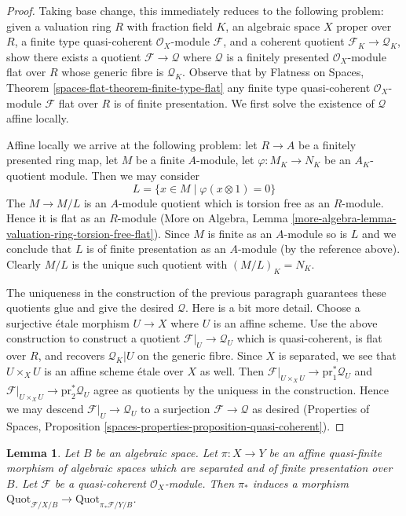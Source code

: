 \documentclass{stacks-project}
\theoremstyle{plain}
\newtheorem{lemma}[subsection]{Lemma}
\theoremstyle{definition}
\theoremstyle{remark}
\numberwithin{equation}{subsection}
\def\Quotfunctor{\mathrm{Quot}}
\begin{document}
\begin{proof}
Taking base change, this immediately reduces to the following
problem: given a valuation ring $R$ with fraction field $K$,
an algebraic space $X$ proper over $R$, a finite type quasi-coherent
$\mathcal{O}_X$-module $\mathcal{F}$, and a coherent
quotient $\mathcal{F}_K \to \mathcal{Q}_K$, show there exists
a quotient $\mathcal{F} \to \mathcal{Q}$ where $\mathcal{Q}$ is a
finitely presented $\mathcal{O}_X$-module
flat over $R$ whose generic fibre is $\mathcal{Q}_K$.
Observe that by Flatness on Spaces, Theorem
\ref{spaces-flat-theorem-finite-type-flat}
any finite type quasi-coherent $\mathcal{O}_X$-module
$\mathcal{F}$ flat over $R$ is of finite presentation.
We first solve the existence of $\mathcal{Q}$ affine locally.

\medskip\noindent
Affine locally we arrive at the following problem:
let $R \to A$ be a finitely presented ring map,
let $M$ be a finite $A$-module, let $\varphi : M_K \to N_K$ be
an $A_K$-quotient module. Then we may consider
$$
L = \{x \in M \mid \varphi(x \otimes 1) = 0 \}
$$
The $M \to M/L$ is an $A$-module quotient which is
torsion free as an $R$-module. Hence it is flat as an
$R$-module (More on Algebra, Lemma
\ref{more-algebra-lemma-valuation-ring-torsion-free-flat}).
Since $M$ is finite as an $A$-module so is $L$ and we
conclude that $L$ is of finite presentation as an $A$-module
(by the reference above). Clearly $M/L$ is the unique such
quotient with $(M/L)_K = N_K$.

\medskip\noindent
The uniqueness in the construction of the previous paragraph
guarantees these quotients glue and give the desired $\mathcal{Q}$.
Here is a bit more detail. Choose a surjective \'etale morphism
$U \to X$ where $U$ is an affine scheme. Use the above construction
to construct a quotient $\mathcal{F}|_U \to \mathcal{Q}_U$
which is quasi-coherent, is flat over $R$, and recovers $\mathcal{Q}_K|U$
on the generic fibre. Since $X$ is separated, we see that
$U \times_X U$ is an affine scheme \'etale over $X$ as well.
Then $\mathcal{F}|_{U \times_X U} \to \text{pr}_1^*\mathcal{Q}_U$ and
$\mathcal{F}|_{U \times_X U} \to \text{pr}_2^*\mathcal{Q}_U$
agree as quotients by the uniquess in the construction. Hence we may descend
$\mathcal{F}|_U \to \mathcal{Q}_U$ to a surjection
$\mathcal{F} \to \mathcal{Q}$ as desired (Properties of Spaces,
Proposition \ref{spaces-properties-proposition-quasi-coherent}).
\end{proof}

\begin{lemma}
\label{lemma-quot-functorial}
Let $B$ be an algebraic space. Let $\pi : X \to Y$ be an affine quasi-finite
morphism of algebraic spaces which are separated and of finite presentation
over $B$. Let $\mathcal{F}$ be a quasi-coherent $\mathcal{O}_X$-module.
Then $\pi_*$ induces a morphism
$\Quotfunctor_{\mathcal{F}/X/B} \to \Quotfunctor_{\pi_*\mathcal{F}/Y/B}$.
\end{lemma}
\end{document}

